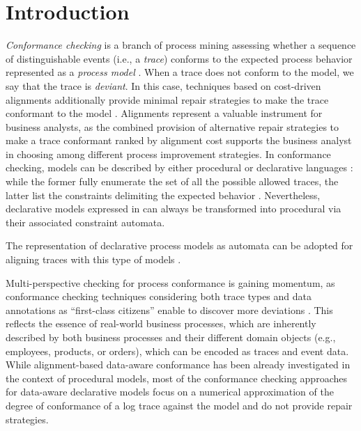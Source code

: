 \section{Introduction}
\label{sec:introduction}

\textit{Conformance checking} is a branch of process mining  assessing whether a sequence of distinguishable events (i.e., a \textit{trace}) conforms to the expected process behavior represented as a \textit{process model} \cite{RozinatA08}. When a trace does not conform to the model, we say that the trace is \textit{deviant}. In this case, techniques based on cost-driven alignments additionally provide minimal repair strategies to make the trace conformant to the model \cite{LeoniA13}. Alignments represent a valuable instrument for business analysts, as the combined provision of alternative repair strategies to make a trace conformant ranked by alignment cost supports the business analyst in choosing among different process improvement strategies. In conformance checking, models can be described by either procedural or declarative languages : while the former fully enumerate the set of all the possible allowed traces, the latter  list the constraints delimiting the expected behavior \cite{LeoniA13,Westergaard11}. Nevertheless,  declarative models expressed in  can always be transformed into procedural via their associated constraint automata. 

The representation of declarative process models as automata can be adopted for aligning traces with this type of models \cite{LeoniMA12,XuLZ17a}.


Multi-perspective checking for process conformance is gaining momentum, as conformance checking techniques considering both trace types and data annotations as ``first-class citizens'' enable to discover more deviations \cite{MultiPerspective}. This reflects the essence of real-world business processes, which are inherently described by both business processes and their different domain objects \cite{PetermannJMR14} (e.g., employees, products, or orders), which can be encoded as traces and event data. While alignment-based  data-aware conformance has been already investigated in the context of procedural models, most of the conformance checking approaches for data-aware declarative models \cite{BurattinMS16,Borrego014} focus on a numerical approximation of the degree of conformance of a log trace against the model and do not provide repair strategies.

